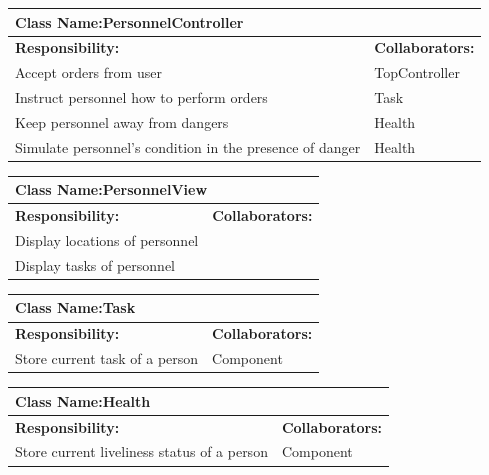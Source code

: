 \documentclass[]{article}
\begin{document}
	\begin{table}[ht]
		\centering
		\begin{tabular}{|p{5cm}|p{5cm}|}
		\hline 
		 \multicolumn{2}{|l|}{\textbf{Class Name:}PersonnelController} \\
		\hline
		\textbf{Responsibility:} & \textbf{Collaborators:} \\
		\hline
		Accept orders from user & TopController \\
		\hline
		Instruct personnel how to perform orders & Task \\
		\hline
		Keep personnel away from dangers & Health \\
		\hline
		Simulate personnel's condition in the presence of danger & Health \\
		\hline
		\end{tabular}
	\end{table}
	\begin{table}[ht]
		\centering
		\begin{tabular}{|p{5cm}|p{5cm}|}
		\hline 
		 \multicolumn{2}{|l|}{\textbf{Class Name:}PersonnelView} \\
		\hline
		\textbf{Responsibility:} & \textbf{Collaborators:} \\
		\hline
		Display locations of personnel &  \\
		\hline
		Display tasks of personnel &  \\
		\hline
		\end{tabular}
	\end{table}
	\begin{table}[ht]
		\centering
		\begin{tabular}{|p{5cm}|p{5cm}|}
		\hline 
		 \multicolumn{2}{|l|}{\textbf{Class Name:}Task} \\
		\hline
		\textbf{Responsibility:} & \textbf{Collaborators:} \\
		\hline 
		Store current task of a person & Component \\
		\hline
		\end{tabular}	
	\end{table}
	\begin{table}[ht]
		\centering
		\begin{tabular}{|p{5cm}|p{5cm}|}
		\hline 
		 \multicolumn{2}{|l|}{\textbf{Class Name:}Health} \\
		\hline
		\textbf{Responsibility:} & \textbf{Collaborators:} \\
		\hline 
		Store current liveliness status of a person & Component \\
		\hline
		\end{tabular}	
	\end{table}
\end{document}

